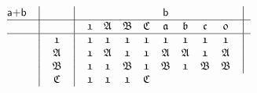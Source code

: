 \documentclass[final,12pt,a4paper,twoside,fleqn]{extbook}
\theoremstyle{definition}
\theoremstyle{remark}
\begin{document}
\begin{equation}
  \begin{array}{@{}*{22}c@{}}
      {\textsf{a+b}}&%
      \big\vert     &%
      {}            &%
      \big\vert     &%
      {}            &%
      {}            &%
      {}            &%
      {}            &%
      {\textsf{b}}  &%
      {}            &%
      {}            &%
      {}            &%
      \big\vert      %
      \\ \hline \nonumber
      {}            &%
      \big\vert     &%
      {}            &%
      \big\vert     &%
      {\mathfrak{1}}&%
      {\mathfrak{A}}&%
      {\mathfrak{B}}&%
      {\mathfrak{C}}&%
      {\mathfrak{a}}&%
      {\mathfrak{b}}&%
      {\mathfrak{c}}&%
      {\mathfrak{0}}&%
      \big\vert      %
      \\ \hline \nonumber
      {}            &%
      \big\vert     &%
      {\mathfrak{1}}&%
      \big\vert     &%
      {\mathfrak{1}}&%
      {\mathfrak{1}}&%
      {\mathfrak{1}}&%
      {\mathfrak{1}}&%
      {\mathfrak{1}}&%
      {\mathfrak{1}}&%
      {\mathfrak{1}}&%
      {\mathfrak{1}}&%
      \big\vert      %
      \\ \nonumber
      {}            &%
      \big\vert     &%
      {\mathfrak{A}}&%
      \big\vert     &%
      {\mathfrak{1}}&%
      {\mathfrak{A}}&%
      {\mathfrak{1}}&%
      {\mathfrak{1}}&%
      {\mathfrak{A}}&%
      {\mathfrak{A}}&%
      {\mathfrak{1}}&%
      {\mathfrak{A}}&%
      \big\vert      %
      \\ \nonumber
      {}            &%
      \big\vert     &%
      {\mathfrak{B}}&%
      \big\vert     &%
      {\mathfrak{1}}&%
      {\mathfrak{1}}&%
      {\mathfrak{B}}&%
      {\mathfrak{1}}&%
      {\mathfrak{B}}&%
      {\mathfrak{1}}&%
      {\mathfrak{B}}&%
      {\mathfrak{B}}&%
      \big\vert      %
      \\ \nonumber
      {}             &%
      \big\vert      &%
      {\mathfrak{C}} &%
      \big\vert      &%
      {\mathfrak{1}} &%
      {\mathfrak{1}} &%
      {\mathfrak{1}} &%
      {\mathfrak{C}} &%

\end{array}
\end{equation}
\end{document}
